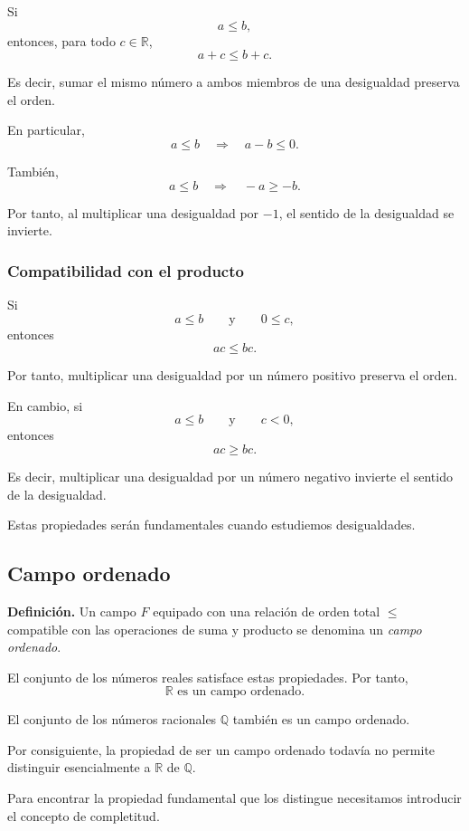 \documentclass[12pt]{article}
\begin{document}
Si
\[
a\leq b,
\]
entonces, para todo $c\in\mathbb{R}$,
\[
a+c\leq b+c.
\]

Es decir, sumar el mismo número a ambos miembros de una desigualdad
preserva el orden.

En particular,
\[
a\leq b
\quad\Longrightarrow\quad
a-b\leq 0.
\]

También,
\[
a\leq b
\quad\Longrightarrow\quad
-a\geq -b.
\]

Por tanto, al multiplicar una desigualdad por $-1$, el sentido de la
desigualdad se invierte.

\subsubsection*{Compatibilidad con el producto}

Si
\[
a\leq b
\qquad\text{y}\qquad
0\leq c,
\]
entonces
\[
ac\leq bc.
\]

Por tanto, multiplicar una desigualdad por un número positivo preserva
el orden.

En cambio, si
\[
a\leq b
\qquad\text{y}\qquad
c<0,
\]
entonces
\[
ac\geq bc.
\]

Es decir, multiplicar una desigualdad por un número negativo invierte
el sentido de la desigualdad.

Estas propiedades serán fundamentales cuando estudiemos desigualdades.

\subsection{Campo ordenado}

\textbf{Definición.}
Un campo $F$ equipado con una relación de orden total $\leq$ compatible
con las operaciones de suma y producto se denomina un
\emph{campo ordenado}.

El conjunto de los números reales satisface estas propiedades. Por tanto,
\[
\boxed{\mathbb{R}\text{ es un campo ordenado}.}
\]

El conjunto de los números racionales $\mathbb{Q}$ también es un campo
ordenado.

Por consiguiente, la propiedad de ser un campo ordenado todavía no permite
distinguir esencialmente a $\mathbb{R}$ de $\mathbb{Q}$.

Para encontrar la propiedad fundamental que los distingue necesitamos
introducir el concepto de completitud.
\end{document}
